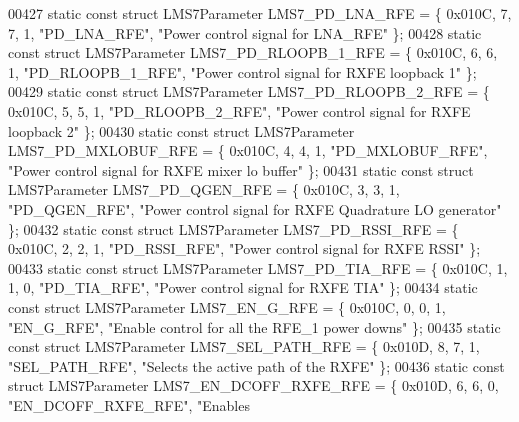 \begin{DoxyCode}
00427 \textcolor{keyword}{static} \textcolor{keyword}{const} \textcolor{keyword}{struct }LMS7Parameter LMS7_PD_LNA_RFE = \{ 0x010C, 7, 7, 1, \textcolor{stringliteral}{"PD\_LNA\_RFE"}, \textcolor{stringliteral}{"Power control signal
       for LNA\_RFE"} \};
00428 \textcolor{keyword}{static} \textcolor{keyword}{const} \textcolor{keyword}{struct }LMS7Parameter LMS7_PD_RLOOPB_1_RFE = \{ 0x010C, 6, 6, 1, \textcolor{stringliteral}{"PD\_RLOOPB\_1\_RFE"}, \textcolor{stringliteral}{"Power
       control signal for RXFE loopback 1"} \};
00429 \textcolor{keyword}{static} \textcolor{keyword}{const} \textcolor{keyword}{struct }LMS7Parameter LMS7_PD_RLOOPB_2_RFE = \{ 0x010C, 5, 5, 1, \textcolor{stringliteral}{"PD\_RLOOPB\_2\_RFE"}, \textcolor{stringliteral}{"Power
       control signal for RXFE loopback 2"} \};
00430 \textcolor{keyword}{static} \textcolor{keyword}{const} \textcolor{keyword}{struct }LMS7Parameter LMS7_PD_MXLOBUF_RFE = \{ 0x010C, 4, 4, 1, \textcolor{stringliteral}{"PD\_MXLOBUF\_RFE"}, \textcolor{stringliteral}{"Power control
       signal for RXFE mixer lo buffer"} \};
00431 \textcolor{keyword}{static} \textcolor{keyword}{const} \textcolor{keyword}{struct }LMS7Parameter LMS7_PD_QGEN_RFE = \{ 0x010C, 3, 3, 1, \textcolor{stringliteral}{"PD\_QGEN\_RFE"}, \textcolor{stringliteral}{"Power control
       signal for RXFE Quadrature LO generator"} \};
00432 \textcolor{keyword}{static} \textcolor{keyword}{const} \textcolor{keyword}{struct }LMS7Parameter LMS7_PD_RSSI_RFE = \{ 0x010C, 2, 2, 1, \textcolor{stringliteral}{"PD\_RSSI\_RFE"}, \textcolor{stringliteral}{"Power control
       signal for RXFE RSSI"} \};
00433 \textcolor{keyword}{static} \textcolor{keyword}{const} \textcolor{keyword}{struct }LMS7Parameter LMS7_PD_TIA_RFE = \{ 0x010C, 1, 1, 0, \textcolor{stringliteral}{"PD\_TIA\_RFE"}, \textcolor{stringliteral}{"Power control signal
       for RXFE TIA"} \};
00434 \textcolor{keyword}{static} \textcolor{keyword}{const} \textcolor{keyword}{struct }LMS7Parameter LMS7_EN_G_RFE = \{ 0x010C, 0, 0, 1, \textcolor{stringliteral}{"EN\_G\_RFE"}, \textcolor{stringliteral}{"Enable control for all
       the RFE\_1 power downs"} \};
00435 \textcolor{keyword}{static} \textcolor{keyword}{const} \textcolor{keyword}{struct }LMS7Parameter LMS7_SEL_PATH_RFE = \{ 0x010D, 8, 7, 1, \textcolor{stringliteral}{"SEL\_PATH\_RFE"}, \textcolor{stringliteral}{"Selects the
       active path of the RXFE"} \};
00436 \textcolor{keyword}{static} \textcolor{keyword}{const} \textcolor{keyword}{struct }LMS7Parameter LMS7_EN_DCOFF_RXFE_RFE = \{ 0x010D, 6, 6, 0, \textcolor{stringliteral}{"EN\_DCOFF\_RXFE\_RFE"}, \textcolor{stringliteral}{"Enables
}
\end{DoxyCode}
